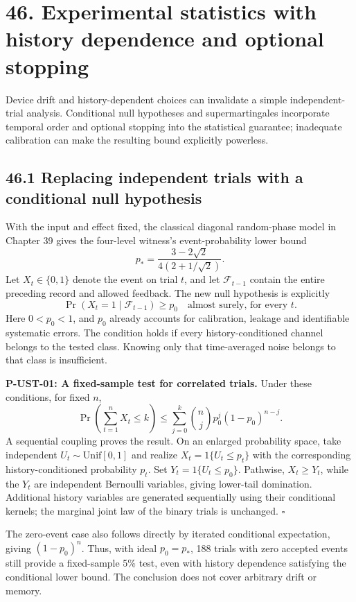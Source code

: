 \documentclass[
  11pt,
  oneside]{book}
\begin{document}
\chapter{46. Experimental statistics with history dependence and
optional stopping}\label{ch-46}

Device drift and history-dependent choices can invalidate a simple
independent-trial analysis. Conditional null hypotheses and
supermartingales incorporate temporal order and optional stopping into
the statistical guarantee; inadequate calibration can make the resulting
bound explicitly powerless.

\section{46.1 Replacing independent trials with a conditional null
hypothesis}

With the input and effect fixed, the classical diagonal random-phase
model in Chapter 39 gives the four-level witness's event-probability
lower bound \[
p_* =\frac{3-2\sqrt2}{4(2+1/\sqrt2)}.
\] Let \(X_t\in\{0,1\}\) denote the event on trial \(t\), and let
\(\mathcal F_{t-1}\) contain the entire preceding record and allowed
feedback. The new null hypothesis is explicitly \[
\Pr(X_t=1\mid\mathcal F_{t-1})\ge p_0\quad\text{almost surely, for every }t.
\] Here \(0<p_0<1\), and \(p_0\) already accounts for calibration,
leakage and identifiable systematic errors. The condition holds if every
history-conditioned channel belongs to the tested class. Knowing only
that time-averaged noise belongs to that class is insufficient.

\label{p-ust-01}{}

\textbf{P-UST-01: A fixed-sample test for correlated trials.} Under
these conditions, for fixed \(n\), \[
\Pr\left(\sum_{t=1}^nX_t\le k\right)
\le\sum_{j=0}^k{n\choose j}p_0^j(1-p_0)^{n-j}.
\] A sequential coupling proves the result. On an enlarged probability
space, take independent \(U_t\sim\mathrm{Unif}[0,1]\) and realize
\(X_t=1\{U_t\le p_t\}\) with the corresponding history-conditioned
probability \(p_t\). Set \(Y_t=1\{U_t\le p_0\}\). Pathwise,
\(X_t\ge Y_t\), while the \(Y_t\) are independent Bernoulli variables,
giving lower-tail domination. Additional history variables are generated
sequentially using their conditional kernels; the marginal joint law of
the binary trials is unchanged. \(\square\)

The zero-event case also follows directly by iterated conditional
expectation, giving \((1-p_0)^n\). Thus, with ideal \(p_0=p_*\), 188
trials with zero accepted events still provide a fixed-sample 5\% test,
even with history dependence satisfying the conditional lower bound. The
conclusion does not cover arbitrary drift or memory.
\end{document}
